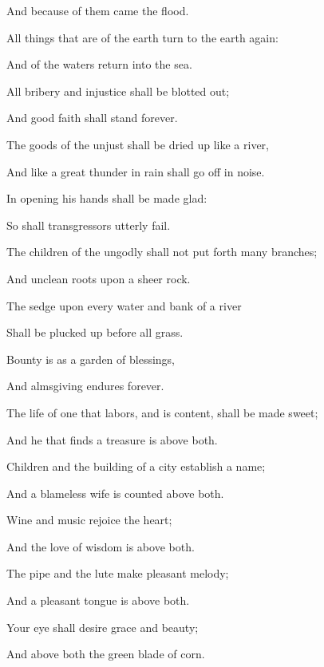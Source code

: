 {\par }{\Q And because of them came the flood.
\par }{\Q {}All things that are of the earth turn to the earth again:
\par }{\Q And
{} of the waters return into the sea.
\par }{\BB \par }{\Q {}All bribery and injustice shall be blotted out;
\par }{\Q And good faith shall stand forever.
\par }{\Q {}The goods of the unjust shall be dried up like a river,
\par }{\Q And like a great thunder in rain shall go off in noise.
\par }{\Q {}In opening his hands
{} shall be made glad:
\par }{\Q So shall transgressors utterly fail.
\par }{\Q {}The children of the ungodly shall not put forth many branches;
\par }{\Q And
{} unclean roots upon a sheer rock.
\par }{\Q {}The sedge
{} upon every water and bank of a river
\par }{\Q Shall be plucked up before all grass.
\par }{\Q {}Bounty is as a garden
 of blessings,
\par }{\Q And almsgiving endures forever.
\par }{\BB \par }{\Q {}The life of one that labors, and is content, shall be made sweet;
\par }{\Q And he that finds a treasure is above both.
\par }{\Q {}Children and the building of a city establish a
{} name;
\par }{\Q And a blameless wife is counted above both.
\par }{\Q {}Wine and music rejoice the heart;
\par }{\Q And the love of wisdom is above both.
\par }{\Q {}The pipe and the lute make pleasant melody;
\par }{\Q And a pleasant tongue is above both.
\par }{\Q {}Your eye shall desire grace and beauty;
\par }{\Q And above both the green blade of corn.
}
